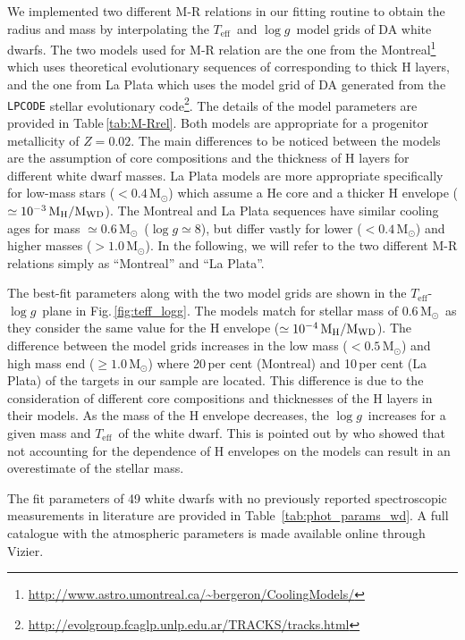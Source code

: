 \documentclass[fleqn,usenatbib, useAMS]{mnras}
\newcommand{\Teff}{\mbox{$T_{\mathrm{eff}}$}}
\newcommand{\logg}{\mbox{$\log g$}}
\newcommand{\Msun}{\mbox{$\mathrm{M_\odot}$}}
\begin{document}
We implemented two different M-R relations in our fitting routine to obtain the radius and mass by interpolating the \Teff\ and \logg\ model grids of DA white dwarfs. The two models used for M-R relation are the one from the Montreal\footnote{\url{http://www.astro.umontreal.ca/~bergeron/CoolingModels/}} which uses theoretical evolutionary sequences of \cite{Bedard2020} corresponding to thick H layers, and the one from La Plata \citep{Althaus2013, Camisassa2016, Camisassa2019} which uses the model grid of DA generated from the {\tt LPCODE} \citep{Althaus2005} stellar evolutionary code\footnote{\url{http://evolgroup.fcaglp.unlp.edu.ar/TRACKS/tracks.html}}. The details of the model parameters are provided in Table\,\ref{tab:M-Rrel}. Both models are appropriate for a progenitor metallicity of $Z = 0.02$. The main differences to be noticed between the models are the assumption of core compositions and the thickness of H layers for different white dwarf masses. La Plata models are more appropriate specifically for low-mass stars  ($<0.4\,\Msun$) which assume a He core and a thicker H envelope ($\simeq10^{-3}\,\rm{M_{H}}/M_{WD}$). The Montreal and La Plata sequences have similar cooling ages for mass $\simeq0.6$\,\Msun\ ($\logg\simeq8$), but differ vastly for lower ($<0.4\,\Msun$) and higher masses ($>1.0\,\Msun$). In the following, we will refer to the two different M-R relations simply as ``Montreal'' and ``La Plata''.

The best-fit parameters along with the two model grids are shown in the \Teff-\logg\ plane in Fig.\,\ref{fig:teff_logg}. The models match for stellar mass of 0.6\,\Msun\ as they consider the same value for the H envelope ($\simeq10^{-4}\,\rm{M_{H}}/M_{WD}$). The difference between the model grids increases in the low mass ($<0.5\,\Msun$) and high mass end ($\geq1.0\,\Msun$) where 20\,per cent (Montreal) and 10\,per cent (La Plata) of the targets in our sample are located. This difference is due to the consideration of different core compositions and thicknesses of the H layers in their models. As the mass of the H envelope decreases, the \logg\ increases for a given mass and \Teff\ of the white dwarf. This is pointed out by \cite{Romero2019} who showed that not accounting for the dependence of H envelopes on the models can result in an overestimate of the stellar mass. 

The fit parameters of 49 white dwarfs with no previously reported spectroscopic measurements in literature are provided in Table~\ref{tab:phot_params_wd}. A full catalogue with the atmospheric parameters is made available online through Vizier. 
\end{document}
